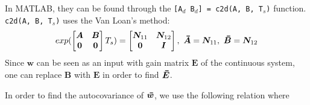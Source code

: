 In MATLAB, they can be found through the
\texttt{[A$_d$\ B$_d$] = c2d(A, B, T$_s$)} function. \\ \texttt{c2d(A, B, T$_s$)} uses the Van Loan's method:
\begin{equation}
exp(
\begin{bmatrix}
\bm{A} & \bm{B} \\
\bm{0} & \bm{0} \\
\end{bmatrix}
T_s) = 
\begin{bmatrix}
\bm{N}_{11} & \bm{N}_{12} \\
\bm{0} & \bm{I} \\
\end{bmatrix}
,\ \thickbar{\bm{A}} = \bm{N}_{11},\  \thickbar{\bm{B}} = \bm{N}_{12}
\end{equation}
Since $\bm{w}$ can be seen as an input with gain matrix $\bm{E}$ of the continuous system, one can replace $\bm{B}$ with $\bm{E}$ in order to find $\thickbar{\bm{E}}$.

In order to find the autocovariance of $\thickbar{\bm{w}}$, we use the following relation where

